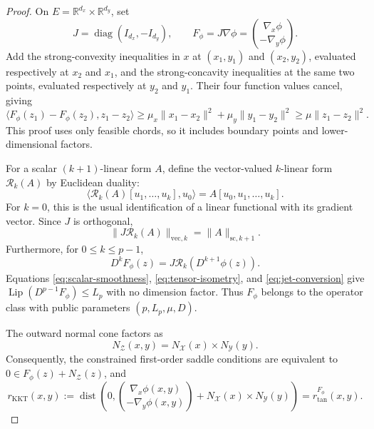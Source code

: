 \documentclass[11pt]{article}
\numberwithin{equation}{section}
\theoremstyle{definition}
\theoremstyle{remark}
\newcommand{\R}{\mathbb R}
\begin{document}
\begin{proof}
On $E=\R^{d_x}\times\R^{d_y}$, set
\begin{equation}\label{eq:signed-gradient}
J=\operatorname{diag}(I_{d_x},-I_{d_y}),
\qquad
F_\phi=J\nabla\phi
=\binom{\nabla_x\phi}{-\nabla_y\phi}.
\end{equation}
Add the strong-convexity inequalities in $x$ at
$(x_1,y_1)$ and $(x_2,y_2)$, evaluated respectively at $x_2$ and
$x_1$, and the strong-concavity inequalities at the same two points,
evaluated respectively at $y_2$ and $y_1$. Their four function values
cancel, giving
\begin{equation}\label{eq:saddle-monotonicity}
\langle F_\phi(z_1)-F_\phi(z_2),z_1-z_2\rangle
\ge\mu_x\|x_1-x_2\|^2+\mu_y\|y_1-y_2\|^2
\ge\mu\|z_1-z_2\|^2.
\end{equation}
This proof uses only feasible chords, so it includes boundary points
and lower-dimensional factors.

For a scalar $(k+1)$-linear form $A$, define the vector-valued
$k$-linear form $\mathcal R_k(A)$ by Euclidean duality:
\[
\langle\mathcal R_k(A)[u_1,\ldots,u_k],u_0\rangle
=A[u_0,u_1,\ldots,u_k].
\]
For $k=0$, this is the usual identification of a linear functional
with its gradient vector. Since $J$ is orthogonal,
\begin{equation}\label{eq:tensor-isometry}
\|J\mathcal R_k(A)\|_{\mathrm{vec},k}
=\|A\|_{\mathrm{sc},k+1}.
\end{equation}
Furthermore, for $0\le k\le p-1$,
\begin{equation}\label{eq:jet-conversion}
D^kF_\phi(z)=J\mathcal R_k(D^{k+1}\phi(z)).
\end{equation}
Equations \eqref{eq:scalar-smoothness}, \eqref{eq:tensor-isometry}, and \eqref{eq:jet-conversion}
give $\operatorname{Lip}(D^{p-1}F_\phi)\le L_p$ with no dimension
factor. Thus $F_\phi$ belongs to the operator class with public
parameters $(p,L_p,\mu,D)$.

The outward normal cone factors as
\begin{equation}\label{eq:product-normal}
N_{\mathcal Z}(x,y)
=N_{\mathcal X}(x)\times N_{\mathcal Y}(y).
\end{equation}
Consequently, the constrained first-order saddle conditions are
equivalent to $0\in F_\phi(z)+N_{\mathcal Z}(z)$, and
\begin{equation}\label{eq:residual-identity}
r_{\mathrm{KKT}}(x,y)
:=\operatorname{dist}\!\left(0,
\binom{\nabla_x\phi(x,y)}{-\nabla_y\phi(x,y)}
+N_{\mathcal X}(x)\times N_{\mathcal Y}(y)\right)
=r_{\mathrm{tan}}^{F_\phi}(x,y).
\end{equation}


\end{proof}
\end{document}
